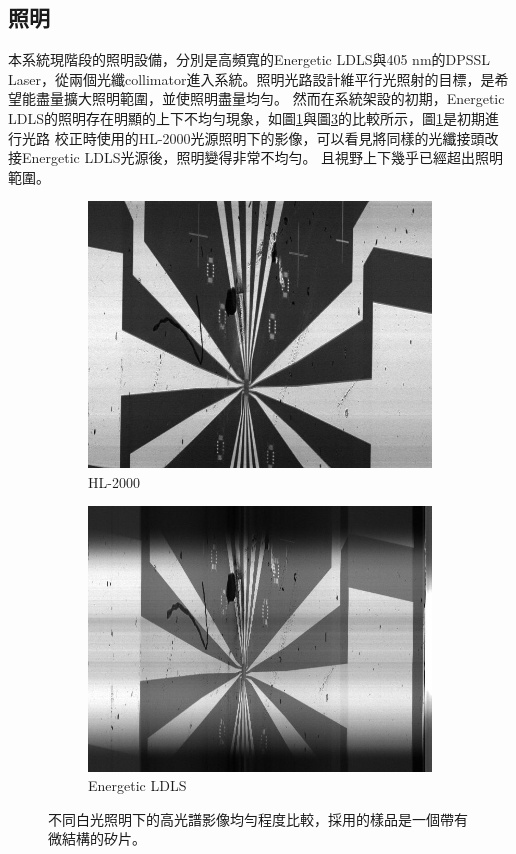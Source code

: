 \documentclass[12pt]{article}
\begin{document}
\subsection{照明}
本系統現階段的照明設備，分別是高頻寬的Energetic LDLS與405 nm的DPSSL Laser，從兩個光纖collimator進入系統。照明光路設計維平行光照射的目標，是希望能盡量擴大照明範圍，並使照明盡量均勻。
然而在系統架設的初期，Energetic LDLS的照明存在明顯的上下不均勻現象，如圖\ref{fig: hl2000}與圖\ref{fig: energetic}的比較所示，圖\ref{fig: hl2000}是初期進行光路
校正時使用的HL-2000光源照明下的影像，可以看見將同樣的光纖接頭改接Energetic LDLS光源後，照明變得非常不均勻。
且視野上下幾乎已經超出照明範圍。
\begin{figure}
    \centering
    \begin{subfigure}[b]{0.45\textwidth}
        \includegraphics[width=\linewidth]{0831focusForOmFullScanHL2000Scaled.jpg}
        \caption{HL-2000}
        \label{fig: hl2000}
    \end{subfigure}
    \begin{subfigure}[b]{0.45\textwidth}
        \includegraphics[width=\linewidth]{0909Energetic.jpg}
        \caption{Energetic LDLS}
        \label{fig: energetic}
    \end{subfigure}
    \caption[不同白光照明下的高光譜影像均勻程度比較]{不同白光照明下的高光譜影像均勻程度比較，採用的樣品是一個帶有微結構的矽片。}
\end{figure}  
\end{document}
